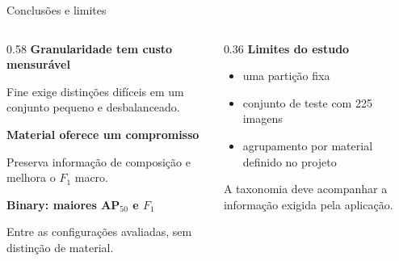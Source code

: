\documentclass[aspectratio=169,10pt]{beamer}
\begin{document}
\begin{frame}{Conclusões e limites}
  \begin{columns}[T,onlytextwidth]
    \begin{column}{0.58\textwidth}
      {\color{ufpidark}\fontsize{16.5}{19}\selectfont\bfseries Granularidade tem custo mensurável}\par
      \vspace{0.12cm}
      {\fontsize{12.5}{15}\selectfont Fine exige distinções difíceis em um conjunto pequeno e desbalanceado.}\par
      \vspace{0.24cm}

      {\color{ufpidark}\fontsize{16.5}{19}\selectfont\bfseries Material oferece um compromisso}\par
      \vspace{0.12cm}
      {\fontsize{12.5}{15}\selectfont Preserva informação de composição e melhora o $F_1$ macro.}\par
      \vspace{0.24cm}

      {\color{ufpidark}\fontsize{16.5}{19}\selectfont\bfseries Binary: maiores AP$_{50}$ e $F_1$}\par
      \vspace{0.12cm}
      {\fontsize{12}{14}\selectfont Entre as configurações avaliadas, sem distinção de material.}
    \end{column}
    \begin{column}{0.36\textwidth}
      {\fontsize{16}{19}\selectfont\bfseries Limites do estudo}\par
      \vspace{0.15cm}
      \begin{itemize}
        \small
        \item uma partição fixa
        \item conjunto de teste com 225 imagens
        \item agrupamento por material definido no projeto
      \end{itemize}
      \vspace{0.22cm}
      {\color{muted}\fontsize{11.5}{14}\selectfont A taxonomia deve acompanhar a informação exigida pela aplicação.}
    \end{column}
  \end{columns}
\end{frame}
\end{document}
